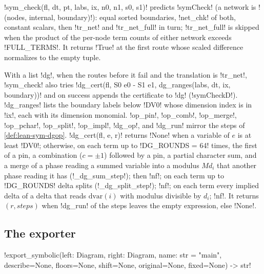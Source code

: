 \py!sym_check(fl, dt, pt, labs, ix, n0, n1, s0, s1)! predicts \lean!symCheck! (a network is \py!(nodes, internal, boundary)!): equal sorted boundaries, \py!net_chk! of both, constant scalars, then \py!tr_net! and \py!tr_net_full! in turn; \py!tr_net_full! is skipped when the product of the per-node term counts of either network exceeds \py!FULL_TERMS!. It returns \py!True! at the first route whose scaled difference normalizes to the empty tuple.

With a list \py!dg!, when the routes before it fail and the translation is \py!tr_net!, \py!sym_check! also tries \py!dg_cert(fl, S0 e0 - S1 e1, dg_ranges(labs, dt, ix, boundary))! and on success appends the certificate to \py!dg! (\lean!symCheckD!). \py!dg_ranges! lists the boundary labels below \py!DV0! whose dimension index is in \py!ix!, each with its dimension monomial. \py!op_pin!, \py!op_comb!, \py!op_merge!, \py!op_pchar!, \py!op_split!, \py!op_impl!, \py!dg_op!, and \py!dg_run! mirror the steps of \cref{def:lean-sym-dgop}. \py!dg_cert(fl, e, r)! returns \py!None! when a variable of $e$ is at least \py!DV0!; otherwise, on each term up to \py!DG_ROUNDS = 64! times, the first of a pin, a combination ($c=\pm1$) followed by a pin, a partial character sum, and a merge of a phase reading a summed variable into a modulus $Md_i$ that another phase reading it has (\py!_dg_sum_step!); then \code!nf!; on each term up to \py!DG_ROUNDS! delta splits (\py!_dg_split_step!); \code!nf!; on each term every implied delta of a delta that reads $\mathrm{dvar}(i)$ with modulus divisible by $d_i$; \code!nf!. It returns $(r,\mathit{steps})$ when \py!dg_run! of the steps leaves the empty expression, else \py!None!.

\subsection{The exporter}

\begin{signature}
\py!export_symbolic(left: Diagram, right: Diagram, name: str = "main", describe=None, floors=None, shift=None, original=None, fixed=None) -> str!
\end{signature}

